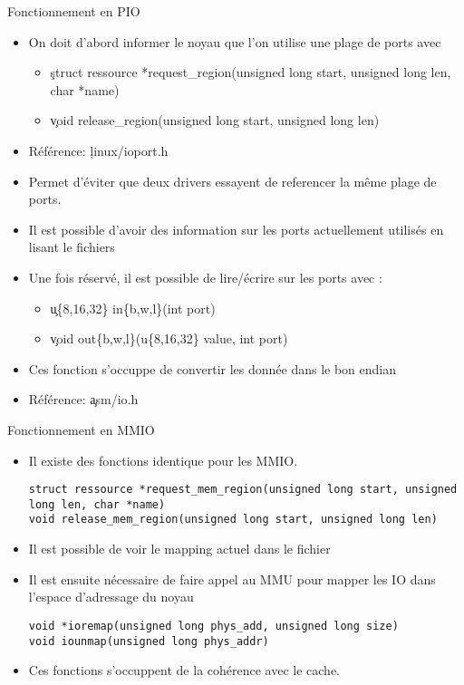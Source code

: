 \begin{frame}[fragile=singleslide]{Fonctionnement en PIO}
  \begin{itemize} 
  \item On doit  d'abord informer le noyau que  l'on utilise une plage
    de ports avec
    \begin{itemize} 
    \item \c{struct ressource *request_region(unsigned long start, unsigned long len, char *name)}
    \item \c{void release_region(unsigned long start, unsigned long len)}
    \end{itemize}
  \item Référence: \c{linux/ioport.h}
  \item  Permet d'éviter que  deux drivers  essayent de  referencer la
    même plage de ports.
  \item  Il  est  possible  d'avoir  des  information  sur  les  ports
    actuellement utilisés en lisant le fichiers 
  \item Une fois réservé, il est possible de lire/écrire sur les ports
    avec :
    \begin{itemize} 
    \item \c{u\{8,16,32\} in\{b,w,l\}(int port)}
    \item \c{void out\{b,w,l\}(u\{8,16,32\} value, int port)}
    \end{itemize} 
  \item Ces  fonction s'occuppe  de convertir les  donnée dans  le bon
    endian
  \item Référence: \c{asm/io.h}
  \end{itemize} 
\end{frame} 

\begin{frame}[fragile=singleslide]{Fonctionnement en MMIO}
  \begin{itemize} 
  \item Il existe des fonctions identique pour les MMIO.
    \begin{lstlisting} 
struct ressource *request_mem_region(unsigned long start, unsigned long len, char *name)
void release_mem_region(unsigned long start, unsigned long len)
    \end{lstlisting} 
  \item  Il est possible  de voir  le mapping  actuel dans  le fichier
  \item Il  est ensuite nécessaire de  faire appel au  MMU pour mapper
    les IO dans l'espace d'adressage du noyau
    \begin{lstlisting} 
void *ioremap(unsigned long phys_add, unsigned long size)
void iounmap(unsigned long phys_addr)
    \end{lstlisting}  
  \item Ces fonctions s'occuppent de la cohérence avec le cache.
\end{itemize} 
\end{frame}

